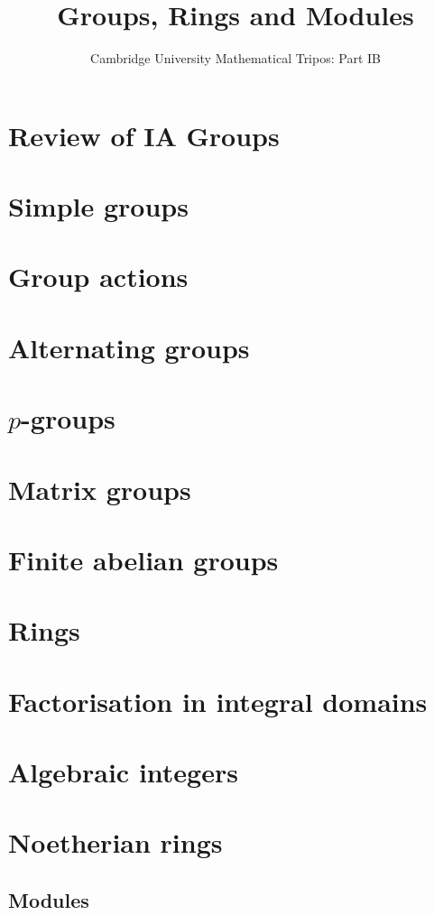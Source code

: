 \documentclass{article}
\title{Groups, Rings and Modules}
\author{Cambridge University Mathematical Tripos: Part IB}
\begin{document}
\maketitle

\tableofcontentsnewpage{}

\section{Review of IA Groups}

\section{Simple groups}

\section{Group actions}

\section{Alternating groups}

\section{\( p \)-groups}

\section{Matrix groups}

\section{Finite abelian groups}

\section{Rings}

\section{Factorisation in integral domains}

\section{Algebraic integers}

\section{Noetherian rings}

\subsection{Modules}

\end{document}
